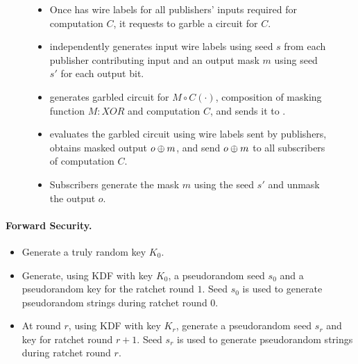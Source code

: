 \begin{figure}[h]
\begin{mdframed}[style=myframe]
\begin{itemize}[leftmargin=*]
	\item Once \broker has wire labels for all publishers' inputs required for
		computation $C$, it requests \garbler to garble a circuit for $C$.  
  
	\item \garbler independently generates input wire labels using seed $s$ from
		each publisher contributing input and an output mask $m$ using seed $s'$
		for each output bit.

	\item \garbler generates garbled circuit for $M \circ C(\cdot)$, composition
		of masking function $M:XOR$ and computation $C$, and sends it to \broker.

	\item \broker evaluates the garbled circuit using wire labels sent by
		publishers, obtains masked output $o \oplus m$, and send $o \oplus m$ to all
		subscribers of computation $C$.
  
	\item Subscribers generate the mask $m$ using the seed $s'$ and unmask the
		output $o$.

\end{itemize}

\end{mdframed}
\end{figure}

\paragraph{Forward Security.}


\begin{itemize}[leftmargin=*]

		\item Generate a truly random key $K_0$.

		\item Generate, using KDF with key $K_0$, a pseudorandom seed $s_0$ and a
			pseudorandom key for the ratchet round $1$. Seed $s_0$ is used to
			generate pseudorandom strings during ratchet round $0$.

		\item At round $r$, using KDF with key $K_r$, generate a pseudorandom seed
			$s_r$ and key for ratchet round $r+1$. Seed $s_r$ is used to generate
			pseudorandom strings during ratchet round $r$.

\end{itemize}

